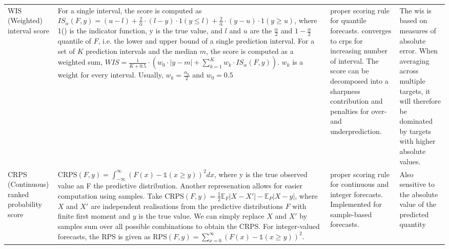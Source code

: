 \begin{sidewaystable}[]
\begin{tabularx}{\linewidth}{|X|X|X|X|}
WIS (Weighted) interval score                                           & For a single interval, the score is computed as $IS_\alpha(F,y) = (u-l) + \frac{2}{\alpha} \cdot (l-y) \cdot 1(y \leq l) + \frac{2}{\alpha} \cdot (y-u) \cdot 1(y \geq u)$, where 1() is the indicator function, y is the true value, and $l$ and $u$ are the $\frac{\alpha}{2}$ and $1 - \frac{\alpha}{2}$ quantile of $F$, i.e. the lower and upper bound of a single prediction interval. For a set of $K$ prediction intervals and the median $m$, the score is computed as a weighted sum, $WIS = \frac{1}{K + 0.5} \cdot (w_0 \cdot |y - m| + \sum_{k = 1}^{K} w_k \cdot IS_{\alpha}(F, y))$. $w_k$ is a weight for every interval. Usually, $w_k = \frac{\alpha_k}{2}$ and $w_0 = 0.5$                                                                                                                                                                                                                   & proper scoring rule for quantile forecasts. converges to crps for increasing number of interval. The score can be decomposed into a sharpness contribution and penalties for over- and underprediction.                                                                                                                                                                                                                                        & The wis is based on measures of absolute error. When averaging across multiple targets, it will therefore be dominated by targets with higher absolute values. \\
CRPS (Continuous) ranked probability score                              & $\text{CRPS}(F, y) = \int_{-\infty}^\infty \left( F(x) - \mathbb{1}(x \geq y) \right)^2 dx$, where y is the true observed value an F the predictive distribution. Another represenation allows for easier computation using samples. Take $ \text{CRPS}(F, y) = \frac{1}{2} \mathbb{E}_{F} |X - X'| - \mathbb{E}_P |X - y|$, where $X$ and $X'$ are independent realisations from the predictive distributions $F$ with finite first moment and $y$ is the true value. We can simply replace $X$ and $X'$ by samples sum over all possible combinations to obtain the CRPS.  For integer-valued forecasts, the RPS is given as $ \text{RPS}(F, y) = \sum_{x = 0}^\infty (F(x) - \mathbb{1} (x \geq y))^2. $                                                                                                                                                                                                     & proper scoring rule for continuous and integer forecasts. Implemented for sample-based forecasts.                                                                                                                                                                                                                                                                                                                                              & Also sensitive to the absolute value of the predicted quantity                                                                                                 \\

\end{tabularx}
\end{sidewaystable}
